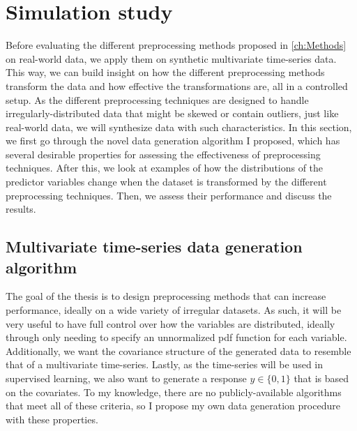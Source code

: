 \documentclass{statsmsc}
\begin{document}
{%

\section{Simulation study}%
\label{sec:Simulation study}%

Before evaluating the different preprocessing methods proposed in \cref{ch:Methods} on real-world
data, we apply them on synthetic multivariate time-series data. This way, we can build
insight on how the different preprocessing methods transform the data and how effective the
transformations are, all in a controlled setup. As the different preprocessing techniques are
designed to handle irregularly-distributed data that might be skewed or contain outliers, just like
real-world data, we will synthesize data with such characteristics.
In this section, we first go through the novel data generation algorithm I proposed, which
has several desirable properties for assessing the effectiveness of preprocessing
techniques. After this, we look at examples of how the distributions of the predictor variables
change when the dataset is transformed by the different preprocessing techniques. Then, we assess
their performance and discuss the results.



\subsection{Multivariate time-series data generation algorithm}%
\label{sub:data_gen}

The goal of the thesis is to design preprocessing methods that can increase performance,
ideally on a wide variety of irregular datasets.
As such, it will be very useful to have full control over how
the variables are distributed, ideally through only needing to specify an
unnormalized \ac{pdf} function for each variable.  Additionally, we
want the covariance structure of the generated data to resemble that of a
multivariate time-series. Lastly, as the time-series will be used in supervised
learning, we also want to generate a response $y \in \{0,1\}$ that is based on the
covariates. To my knowledge, there are no publicly-available
algorithms that meet all of these criteria, so I propose my own
data generation procedure with these properties.

}
\end{document}
